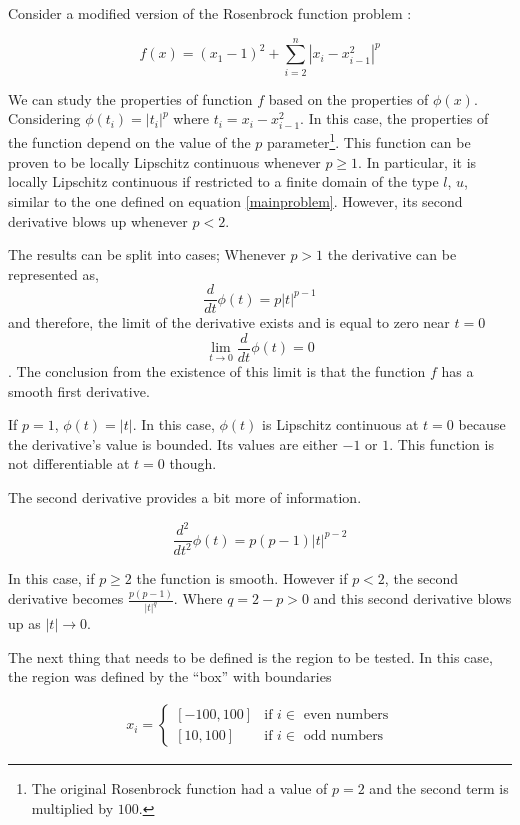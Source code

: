 Consider a modified version of the Rosenbrock function problem \citep{rosenbrock}:

\begin{equation} \label{modifiedrosenbrock}
    f(x) = (x_1 - 1)^2 + \sum_{i = 2}^n |x_i - x_{i - 1}^2|^p
\end{equation}

We can study the properties of function $f$ based on the properties of $\phi(x)$. Considering $\phi(t_i) = |t_i|^p$ where $t_i = x_i - x_{i - 1}^2$. In this case, the properties of the function depend on the value of the $p$ parameter\footnote{The original Rosenbrock function had a value of $p = 2$ and the second term is multiplied by $100$.}. This function can be proven to be locally Lipschitz continuous whenever $p \geq 1$. In particular, it is locally Lipschitz continuous if restricted to a finite domain of the type $l$, $u$, similar to the one defined on equation \eqref{mainproblem}. However, its second derivative blows up whenever $p < 2$.

The results can be split into cases; Whenever $p > 1$ the derivative can be represented as, 
\begin{equation}\label{firstderiv}
  \frac{d}{dt} \phi(t) = p |t|^{p-1}
\end{equation}
and therefore, the limit of the derivative exists and is equal to zero near $t = 0$ \[ \lim_{t \to 0} \frac{d}{dt}\phi(t) = 0 \]. The conclusion from the existence of this limit is that the function $f$ has a smooth first derivative.

If $p = 1$, $\phi(t) = |t|$. In this case, $\phi(t)$ is Lipschitz continuous at $t = 0$ because the derivative's value is bounded. Its values are either $-1$ or $1$. This function is not differentiable at $t = 0$ though.

The second derivative provides a bit more of information.

\begin{equation}\label{secondderiv}
  \frac{d^2}{dt^2} \phi(t) = p(p-1) |t|^{p-2}
\end{equation}

In this case, if $p \geq 2$ the function is smooth. However if $p < 2$, the second derivative becomes $\frac{p(p-1)}{|t|^{q}}$. Where $q = 2 - p > 0$ and this second derivative blows up as $|t| \to 0$.

The next thing that needs to be defined is the region to be tested. In this case, the region was defined by the ``box'' with boundaries

\begin{equation}
  \begin{aligned}
    x_i = 
    \begin{cases}
      [-100, 100] & \text{if } i \in \text{ even numbers} \\
      [10, 100] & \text{if } i \in \text{ odd numbers}
    \end{cases}
  \end{aligned}
\end{equation}

